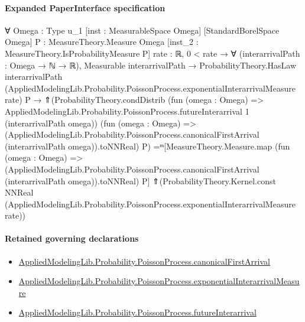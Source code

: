 \documentclass[10pt]{article}
\begin{document}
\paragraph{Expanded PaperInterface specification}
\begin{ReviewVerbatim}
∀ {Omega : Type u_1} [inst : MeasurableSpace Omega] [StandardBorelSpace Omega] {P : MeasureTheory.Measure Omega}
  [inst_2 : MeasureTheory.IsProbabilityMeasure P] {rate : ℝ},
  0 < rate →
    ∀ (interarrivalPath : Omega → ℕ → ℝ),
      Measurable interarrivalPath →
        ProbabilityTheory.HasLaw interarrivalPath
            (AppliedModelingLib.Probability.PoissonProcess.exponentialInterarrivalMeasure rate) P →
          ⇑(ProbabilityTheory.condDistrib
                (fun (omega : Omega) =>
                  AppliedModelingLib.Probability.PoissonProcess.futureInterarrival 1 (interarrivalPath omega))
                (fun (omega : Omega) =>
                  (AppliedModelingLib.Probability.PoissonProcess.canonicalFirstArrival
                      (interarrivalPath omega)).toNNReal)
                P) =ᵐ[MeasureTheory.Measure.map
              (fun (omega : Omega) =>
                (AppliedModelingLib.Probability.PoissonProcess.canonicalFirstArrival (interarrivalPath omega)).toNNReal)
              P]
            ⇑(ProbabilityTheory.Kernel.const NNReal
                (AppliedModelingLib.Probability.PoissonProcess.exponentialInterarrivalMeasure rate))
\end{ReviewVerbatim}

\paragraph{Retained governing declarations}
\begin{itemize}\raggedright
\item \hyperlink{governing-declaration-b0f010330c55d613}{Applied\allowbreak{}Modeling\allowbreak{}Lib.\allowbreak{}Probability.\allowbreak{}Poisson\allowbreak{}Process.\allowbreak{}canonical\allowbreak{}First\allowbreak{}Arrival}
\item \hyperlink{governing-declaration-e0cfe0aeed0b2d78}{Applied\allowbreak{}Modeling\allowbreak{}Lib.\allowbreak{}Probability.\allowbreak{}Poisson\allowbreak{}Process.\allowbreak{}exponential\allowbreak{}Interarrival\allowbreak{}Measure}
\item \hyperlink{governing-declaration-2f60f71b80c5c3dd}{Applied\allowbreak{}Modeling\allowbreak{}Lib.\allowbreak{}Probability.\allowbreak{}Poisson\allowbreak{}Process.\allowbreak{}future\allowbreak{}Interarrival}
\end{itemize}
\end{document}
